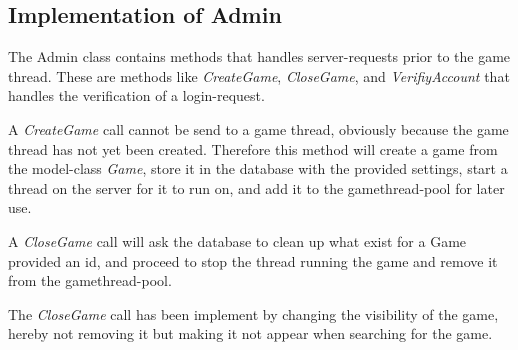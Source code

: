 \subsection{Implementation of Admin}
\label{sec:adminimpl}

The Admin class contains methods that handles server-requests prior to the game thread. These are methods like \textit{CreateGame}, \textit{CloseGame}, and \textit{VerifiyAccount} that handles the verification of a login-request. 

A \textit{CreateGame} call cannot be send to a game thread, obviously because the game thread has not yet been created. Therefore this method will create a game from the model-class \textit{Game}, store it in the database with the provided settings, start a thread on the server for it to run on, and add it to the gamethread-pool for later use. 

A \textit{CloseGame} call will ask the database to clean up what exist for a Game provided an id, and proceed to stop the thread running the game and remove it from the gamethread-pool.



The \textit{CloseGame} call has been implement by changing the visibility of the game, hereby not removing it but making it not appear when searching for the game. 